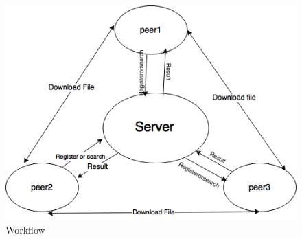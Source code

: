 \documentclass{article}
\begin{document}
\begin{figure} [h]
\centering
        \includegraphics[totalheight=8cm]{workflow.png}
    \caption{Workflow}
    \label{fig:verticalcell}
\end{figure}
\end{document}
